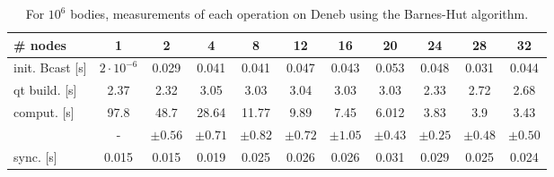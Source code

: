 \begin{table}
  \begin{adjustwidth}{-1.5cm}{-1.5cm}   
\centering
\begin{tabular}{l|cccccccccc}
\# nodes & 1 & 2 & 4 & 8 & 12 & 16 & 20 & 24 & 28 & 32\\
\hline init. Bcast [s] & $2\cdot10^{-6}$ & 0.029 & 0.041 & 0.041 & 0.047 & 0.043 & 0.053 & 0.048 & 0.031 & 0.044\\
qt build. [s] & 2.37 & 2.32 & 3.05 & 3.03 & 3.04 & 3.03 & 3.03 & 2.33 & 2.72 & 2.68\\
comput. [s] & 97.8 & 48.7 & 28.64 & 11.77 & 9.89 & 7.45 & 6.012 & 3.83 & 3.9 & 3.43 \\
& - & $\pm 0.56$ & $\pm 0.71$ & $\pm 0.82$ & $\pm 0.72$ & $\pm 1.05$ & $\pm 0.43$ & $\pm 0.25$ & $\pm 0.48$ & $\pm 0.50$  \\
sync. [s] & 0.015 & 0.015 & 0.019 & 0.025 & 0.026 & 0.026 & 0.031 & 0.029 & 0.025 &0.024\\
\end{tabular}
\caption{For $10^6$ bodies, measurements of each operation on Deneb using the Barnes-Hut algorithm.}
\label{tab:qt:10e6}
  \end{adjustwidth}
\end{table}
\newpage
